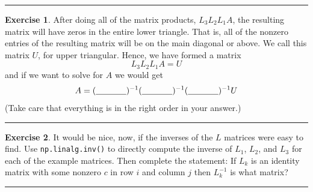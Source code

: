 \documentclass[
]{book}
\theoremstyle{definition}
\theoremstyle{definition}
\theoremstyle{definition}
\newtheorem{exercise}{Exercise}[chapter]
\theoremstyle{remark}
\begin{document}
\begin{center}\rule{0.5\linewidth}{0.5pt}\end{center}

\begin{exercise}
\protect\hypertarget{exr:unnamed-chunk-317}{}{\label{exr:unnamed-chunk-317} }After doing all of the matrix products, \(L_3 L_2 L_1 A\), the resulting matrix will have zeros in the entire lower triangle. That is, all of the nonzero entries of the resulting matrix will be on the main diagonal or above. We call this matrix \(U\), for upper triangular. Hence, we have formed a matrix
\[ L_3 L_2 L_1 A = U \]
and if we want to solve for \(A\) we would get
\[ A = (\underline{\hspace{0.5in}})^{-1} (\underline{\hspace{0.5in}})^{-1} (\underline{\hspace{0.5in}})^{-1} U \]
(Take care that everything is in the right order in your answer.)
\end{exercise}

\begin{center}\rule{0.5\linewidth}{0.5pt}\end{center}

\begin{exercise}
\protect\hypertarget{exr:unnamed-chunk-318}{}{\label{exr:unnamed-chunk-318} }It would be nice, now, if the inverses of the \(L\) matrices were easy to find. Use \texttt{np.linalg.inv()} to directly compute the inverse of \(L_1\), \(L_2\), and \(L_3\) for each of the example matrices. Then complete the statement:
If \(L_k\) is an identity matrix with some nonzero \(c\) in row \(i\) and column \(j\) then \(L_k^{-1}\) is what matrix?
\end{exercise}

\begin{center}\rule{0.5\linewidth}{0.5pt}\end{center}
\end{document}
